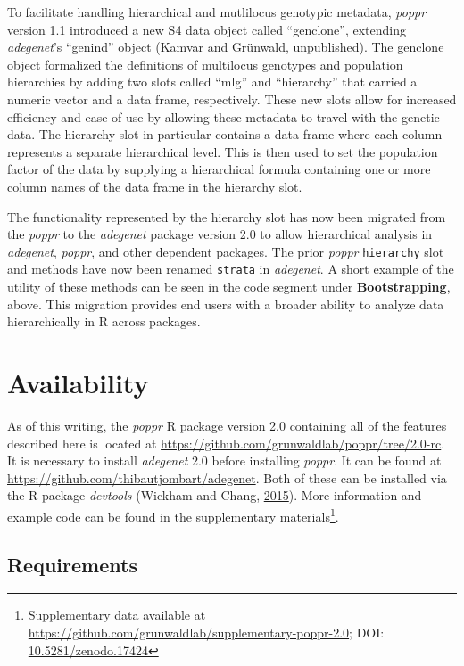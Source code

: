 \documentclass[double,12pt]{beavtex}
\begin{document}
  To facilitate handling hierarchical and mutlilocus genotypic metadata,
  \emph{poppr} version 1.1 introduced a new S4 data object called
  ``genclone'', extending \emph{adegenet}'s ``genind'' object (Kamvar and
  Grünwald, unpublished). The genclone object formalized the definitions
  of multilocus genotypes and population hierarchies by adding two slots
  called ``mlg'' and ``hierarchy'' that carried a numeric vector and a
  data frame, respectively. These new slots allow for increased efficiency
  and ease of use by allowing these metadata to travel with the genetic
  data. The hierarchy slot in particular contains a data frame where each
  column represents a separate hierarchical level. This is then used to
  set the population factor of the data by supplying a hierarchical
  formula containing one or more column names of the data frame in the
  hierarchy slot.
  
  The functionality represented by the hierarchy slot has now been
  migrated from the \emph{poppr} to the \emph{adegenet} package version
  2.0 to allow hierarchical analysis in \emph{adegenet}, \emph{poppr}, and
  other dependent packages. The prior \emph{poppr} \texttt{hierarchy} slot
  and methods have now been renamed \texttt{strata} in \emph{adegenet}. A
  short example of the utility of these methods can be seen in the code
  segment under \textbf{Bootstrapping}, above. This migration provides end
  users with a broader ability to analyze data hierarchically in R across
  packages.
  
  \section{Availability}\label{availability}
  
  As of this writing, the \emph{poppr} R package version 2.0 containing
  all of the features described here is located at
  \url{https://github.com/grunwaldlab/poppr/tree/2.0-rc}. It is necessary
  to install \emph{adegenet} 2.0 before installing \emph{poppr}. It can be
  found at \url{https://github.com/thibautjombart/adegenet}. Both of these
  can be installed via the R package \emph{devtools} (Wickham and Chang,
  \protect\hyperlink{ref-wickham2015devtools}{2015}). More information and
  example code can be found in the supplementary materials\footnote{Supplementary
    data available at
    \url{https://github.com/grunwaldlab/supplementary-poppr-2.0}; DOI:
    \href{http://dx.doi.org/10.5281/zenodo.17424}{10.5281/zenodo.17424}}.
  
  \subsection{Requirements}\label{requirements}
  
\end{document}
